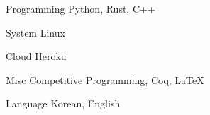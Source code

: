 

\begin{cvskills}




  \cvskill
    {Programming} %
    {Python, Rust, C++} %

  \cvskill
    {System} %
    {Linux} %

  \cvskill
    {Cloud} %
    {Heroku} %

  \cvskill
    {Misc} %
    {Competitive Programming, Coq, LaTeX} %

  \cvskill
    {Language} %
    {Korean, English} %

\end{cvskills}
